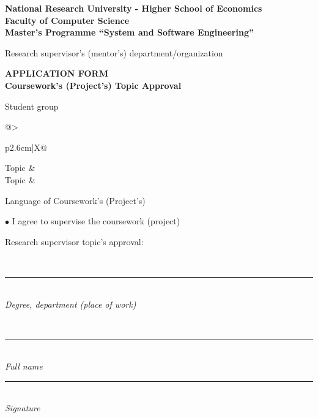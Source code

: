 \documentclass[12pt,a4paper]{article}
\newcommand{\hseSignField}[2]{%
  \begin{minipage}[t]{#1}\centering
    \rule{\linewidth}{0.4pt}\\[-2pt]{\footnotesize\itshape #2}
  \end{minipage}}
\newcommand{\hseFilledField}[3]{%
  \begin{minipage}[t]{#1}\centering
    {\small\strut #2}\\[-4pt]\rule{\linewidth}{0.4pt}\\[-2pt]{\footnotesize\itshape #3}
  \end{minipage}}
\begin{document}
\clearpage
\begin{otherlanguage}{english}
\begin{center}
\textbf{National Research University - Higher School of Economics}\\[4pt]
\textbf{Faculty of Computer Science}\\[4pt]
\textbf{Master’s Programme “System and Software Engineering”}
\end{center}

\vspace{0.6cm}
\begin{minipage}[t]{0.5\textwidth}\raggedright
\small Research supervisor's (mentor's) department/organization\\
\foreignlanguage{russian}{\hseSupervisorDepartment}
\end{minipage}

\vspace{0.6cm}
\begin{center}
\textbf{APPLICATION FORM}\\
\textbf{Coursework's (Project's) Topic Approval}
\end{center}

\vspace{0.4cm}
Student \underline{} group \underline{}

\vspace{0.6cm}
\begin{tabularx}{\textwidth}{@{}>{\raggedright\arraybackslash}p{2.6cm}|X@{}}
Topic & \foreignlanguage{russian}{\hseTitleRu} \\[0.6cm]
Topic & \hseTitleEn \\
\end{tabularx}

\vspace{0.6cm}
Language of Coursework’s (Project’s)\underline{\makebox[4cm][l]{\ \hseWorkLangEn}}

\vspace{0.5cm}
$\bullet$ I agree to supervise the coursework (project)

\vspace{0.3cm}
\begin{minipage}[t]{0.27\textwidth}\raggedright Research supervisor topic's approval:\end{minipage}%
\hseFilledField{0.3\textwidth}{\foreignlanguage{russian}{\hseSupervisorTitle\ifdefempty{\hseSupervisorDegree}{}{, \hseSupervisorDegree}}}{Degree, department (place of work)}\hfill
\hseFilledField{0.22\textwidth}{\foreignlanguage{russian}{\hseSupervisorShortName}}{Full name}\hfill
\hseSignField{0.15\textwidth}{Signature}


\end{otherlanguage}
\end{document}

